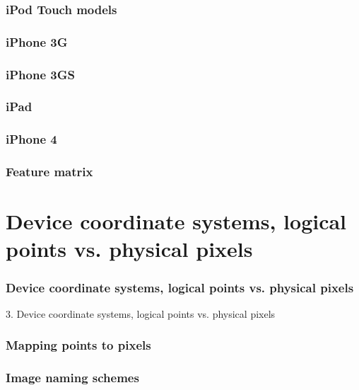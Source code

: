 \documentclass[10pt]{beamer}
\begin{document}
    
\begin{frame}[fragile]
  \frametitle{iPod Touch models}
  
\end{frame}

    
\begin{frame}[fragile]
  \frametitle{iPhone 3G}
  
\end{frame}

    
\begin{frame}[fragile]
  \frametitle{iPhone 3GS}
  
\end{frame}

    
\begin{frame}[fragile]
  \frametitle{iPad}
  
\end{frame}

    
\begin{frame}[fragile]
  \frametitle{iPhone 4}
  
\end{frame}

    
\begin{frame}[fragile]
  \frametitle{Feature matrix}
  
\end{frame}

    

   
  

  
    
\section{Device coordinate systems, logical points vs. physical pixels}
\begin{frame}[fragile]
  \frametitle{Device coordinate systems, logical points vs. physical pixels}
  3. Device coordinate systems, logical points vs. physical pixels
\end{frame}


    
\begin{frame}[fragile]
  \frametitle{Mapping points to pixels}
  
\end{frame}

    
\begin{frame}[fragile]
  \frametitle{Image naming schemes}
  
\end{frame}
\end{document}

